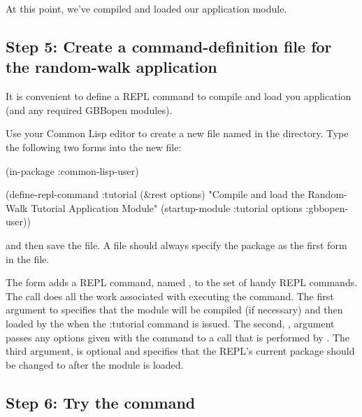 \documentclass[10pt,twoside,english,pdftex]{article}
\begin{document}
At this point, we've compiled and loaded our  application
module.

\subsection*{Step 5: Create a command-definition file for the random-walk
  application}

It is convenient to define a REPL command to compile and load you application
(and any required GBBopen modules).  

Use your Common Lisp editor to create a new file named
 in the  directory. Type the
following two forms into the new  file:
%
%
%
\W\supp
\begin{example}
  (in-package :common-lisp-user)

  (define-repl-command :tutorial (\&rest options)
    "Compile and load the Random-Walk Tutorial Application Module"
    (startup-module :tutorial options :gbbopen-user))
\end{example}
%
and then save the file.  A  file should always
specify the  package as the first form in the
file.

The  form adds a REPL command, named
, to the set of handy REPL commands.  The
 call does all the work associated with
executing the command.  The first argument to 
specifies that the  module will be compiled (if necessary) and
then loaded by the  when the
\code:{tutorial} command is issued.  The second, , argument
passes any options given with the command to a 
call that is performed by .  The third argument,
 is optional and specifies that the REPL's current
package should be changed to  after the
 module is loaded.

\subsection*{Step 6: Try the  command}
\end{document}
